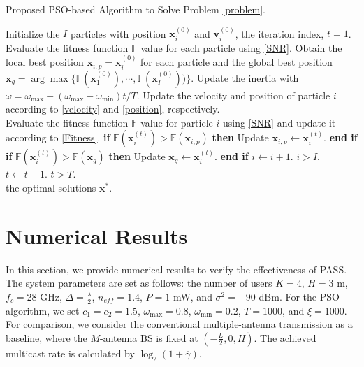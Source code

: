\documentclass[summary]{ursi}
\begin{document}
\begin{algorithm}[!t]\label{method2}
	\caption{Proposed PSO-based Algorithm to Solve Problem \eqref{problem}.}
	\label{alg:A}
	\begin{algorithmic}[1]
		\STATE Initialize the $I$ particles with position $\mathbf{x}^{(0)}_i$ and $\mathbf{v}^{(0)}_i$, the iteration index, $t=1$.
		\STATE Evaluate the fitness function $\mathbb{F}$ value for each particle using \eqref{SNR}.
		\STATE Obtain the local best position $\mathbf{x}_{i,p}=\mathbf{x}^{(0)}_{i}$ for each particle and the global best position $\mathbf{x}_{g} = \arg \max \{\mathbb{F}(\mathbf{x}^{(0)}_{1}),\cdots,\mathbb{F}(\mathbf{x}^{(0)}_{I}))\}$.
		\REPEAT 
		\STATE Update the inertia with $\omega=\omega_{\max}-\left(\omega_{\max}-\omega_{\min}\right)t/T$.
		\REPEAT 
		\STATE Update the velocity and position of particle $i$ according to \eqref{velocity} and \eqref{position}, respectively.\\
		\STATE Evaluate the fitness function $\mathbb{F}$ value for particle $i$ using \eqref{SNR} and update it according to \eqref{Fitness}.
		\STATE \textbf{if} $\mathbb{F}(\mathbf{x}^{(t)}_{i})> \mathbb{F}(\mathbf{x}_{i,p})$ \textbf{then}
		\STATE  \quad Update $\mathbf{x}_{i,p} \leftarrow \mathbf{x}^{(t)}_{i}$.
		\STATE  \textbf{end if}
		\STATE \textbf{if} $\mathbb{F}(\mathbf{x}^{(t)}_{i})> \mathbb{F}(\mathbf{x}_{g})$ \textbf{then}
		\STATE  \quad Update $\mathbf{x}_{g} \leftarrow \mathbf{x}^{(t)}_{i}$.
		\STATE  \textbf{end if}
		\STATE $i \leftarrow i+1$.
		\UNTIL $i>I$.
		\STATE $t \leftarrow t+1$.
		\UNTIL $t>T$.\\
		 the optimal solutions $\mathbf{x}^*$.
	\end{algorithmic}
\end{algorithm}
\section{Numerical Results}
In this section, we provide numerical results to verify the effectiveness of PASS. The system parameters are set as follows: the number of users $K = 4$, $H = 3$ m, $f_c = 28$ GHz, $\Delta=\frac{\lambda}{2}$, $n_{eff}=1.4$, $P=1$ mW, and $\sigma^2=-90$ dBm. For the PSO algorithm, we set $c_1=c_2=1.5$, $\omega_{\max}=0.8$, $\omega_{\min}=0.2$, $T=1000$, and $\xi=1000$. For comparison, we consider the conventional multiple-antenna transmission as a baseline, where the $M$-antenna BS is fixed at $\left( { -\frac{L}{2},0,H} \right)$. The achieved multicast rate is calculated by ${\log _2}\left( {1 + \overline \gamma  } \right)$.
\end{document}
